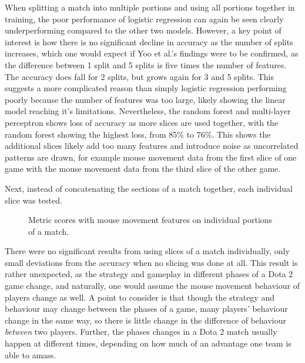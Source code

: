 \documentclass[Report.tex]{subfiles}
\newcommand{\lineaxis}[5]{
\begin{axis}[
    title={#1},
    grid=major,
    xmax=5, xmin=1,
    width=#3,
    height=#4,
    legend style={at={#5},anchor=north,legend columns=-1},
    enlarge x limits=0.4,
	xlabel={Portion of match},
    ylabel={#2}
]
}
\newcommand{\plotline}[4]{
\addplot+[
	discard if not={numSplits}{5},
	discard if not={model}{#1},
	discard if not={features}{#2}
] table [x=split, y=#3, col sep=comma] {data/19-pair-cv.csv};
\addlegendentry{#4}
}
\begin{document}
When splitting a match into multiple portions and using all portions together in training, the poor performance of logistic regression can again be seen clearly underperforming compared to the other two models. However, a key point of interest is how there is no significant decline in accuracy as the number of splits increases, which one would expect if Yoo et al.'s \cite{lr-vs-rf} findings were to be confirmed, as the difference between 1 split and 5 splits is five times the number of features. The accuracy does fall for 2 splits, but grows again for 3 and 5 splits. This suggests a more complicated reason than simply logistic regression performing poorly because the number of features was too large, likely showing the linear model reaching it's limitations. Nevertheless, the random forest and multi-layer perceptron shows loss of accuracy as more slices are used together, with the random forest showing the highest loss, from 85\% to 76\%. This shows the additional slices likely add too many features and introduce noise as uncorrelated patterns are drawn, for example mouse movement data from the first slice of one game with the mouse movement data from the third slice of the other game. 


Next, instead of concatenating the sections of a match together, each individual slice was tested.

\begin{figure}[H]
\centering
{}
\caption{Metric scores with mouse movement features on individual portions of a match. }
\end{figure}

There were no significant results from using slices of a match individually, only small deviations from the accuracy when no slicing was done at all. This result is rather unexpected, as the strategy and gameplay in different phases of a Dota 2 game change, and naturally, one would assume the mouse movement behaviour of players change as well. A point to consider is that though the strategy and behaviour may change between the phases of a game, many players' behaviour change in the same way, so there is little change in the difference of behaviour \textit{between} two players. Further, the phases changes in a Dota 2 match usually happen at different times, depending on how much of an advantage one team is able to amass. 
\end{document}
